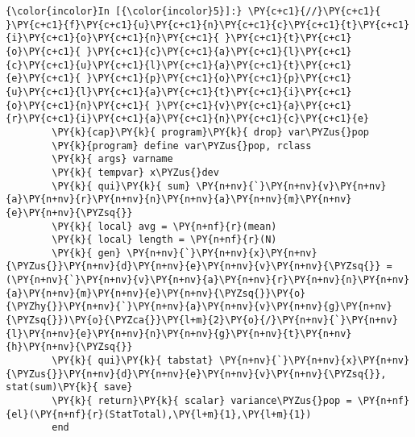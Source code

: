 \documentclass[11pt,notitlepage]{article}\usepackage[]{graphicx}\usepackage[]{color}
\makeatletter
\newenvironment{kframe}{%
 \def\at@end@of@kframe{}%
 \ifinner\ifhmode%
  \def\at@end@of@kframe{\end{minipage}}%
  \begin{minipage}{\columnwidth}%
 \fi\fi%
 \def\FrameCommand##1{\hskip\@totalleftmargin \hskip-\fboxsep
 \colorbox{shadecolor}{##1}\hskip-\fboxsep
     \hskip-\linewidth \hskip-\@totalleftmargin \hskip\columnwidth}%
 \MakeFramed {\advance\hsize-\width
   \@totalleftmargin\z@ \linewidth\hsize
   \@setminipage}}%
 {\par\unskip\endMakeFramed%
 \at@end@of@kframe}
\newenvironment{knitrout}{}{} %
\makeatother
\begin{document}
\begin{enumerate}[a)]
\begin{knitrout}
\begin{kframe}
    \begin{Verbatim}[commandchars=\\\{\}]
{\color{incolor}In [{\color{incolor}5}]:} \PY{c+c1}{//}\PY{c+c1}{ }\PY{c+c1}{f}\PY{c+c1}{u}\PY{c+c1}{n}\PY{c+c1}{c}\PY{c+c1}{t}\PY{c+c1}{i}\PY{c+c1}{o}\PY{c+c1}{n}\PY{c+c1}{ }\PY{c+c1}{t}\PY{c+c1}{o}\PY{c+c1}{ }\PY{c+c1}{c}\PY{c+c1}{a}\PY{c+c1}{l}\PY{c+c1}{c}\PY{c+c1}{u}\PY{c+c1}{l}\PY{c+c1}{a}\PY{c+c1}{t}\PY{c+c1}{e}\PY{c+c1}{ }\PY{c+c1}{p}\PY{c+c1}{o}\PY{c+c1}{p}\PY{c+c1}{u}\PY{c+c1}{l}\PY{c+c1}{a}\PY{c+c1}{t}\PY{c+c1}{i}\PY{c+c1}{o}\PY{c+c1}{n}\PY{c+c1}{ }\PY{c+c1}{v}\PY{c+c1}{a}\PY{c+c1}{r}\PY{c+c1}{i}\PY{c+c1}{a}\PY{c+c1}{n}\PY{c+c1}{c}\PY{c+c1}{e}
        \PY{k}{cap}\PY{k}{ program}\PY{k}{ drop} var\PYZus{}pop
        \PY{k}{program} define var\PYZus{}pop, rclass
        \PY{k}{	args} varname	
        \PY{k}{	tempvar} x\PYZus{}dev 
        \PY{k}{	qui}\PY{k}{ sum} \PY{n+nv}{`}\PY{n+nv}{v}\PY{n+nv}{a}\PY{n+nv}{r}\PY{n+nv}{n}\PY{n+nv}{a}\PY{n+nv}{m}\PY{n+nv}{e}\PY{n+nv}{\PYZsq{}}
        \PY{k}{	local} avg = \PY{n+nf}{r}(mean)
        \PY{k}{	local} length = \PY{n+nf}{r}(N)	
        \PY{k}{	gen} \PY{n+nv}{`}\PY{n+nv}{x}\PY{n+nv}{\PYZus{}}\PY{n+nv}{d}\PY{n+nv}{e}\PY{n+nv}{v}\PY{n+nv}{\PYZsq{}} = (\PY{n+nv}{`}\PY{n+nv}{v}\PY{n+nv}{a}\PY{n+nv}{r}\PY{n+nv}{n}\PY{n+nv}{a}\PY{n+nv}{m}\PY{n+nv}{e}\PY{n+nv}{\PYZsq{}}\PY{o}{\PYZhy{}}\PY{n+nv}{`}\PY{n+nv}{a}\PY{n+nv}{v}\PY{n+nv}{g}\PY{n+nv}{\PYZsq{}})\PY{o}{\PYZca{}}\PY{l+m}{2}\PY{o}{/}\PY{n+nv}{`}\PY{n+nv}{l}\PY{n+nv}{e}\PY{n+nv}{n}\PY{n+nv}{g}\PY{n+nv}{t}\PY{n+nv}{h}\PY{n+nv}{\PYZsq{}}
        \PY{k}{	qui}\PY{k}{ tabstat} \PY{n+nv}{`}\PY{n+nv}{x}\PY{n+nv}{\PYZus{}}\PY{n+nv}{d}\PY{n+nv}{e}\PY{n+nv}{v}\PY{n+nv}{\PYZsq{}}, stat(sum)\PY{k}{ save}
        \PY{k}{	return}\PY{k}{ scalar} variance\PYZus{}pop = \PY{n+nf}{el}(\PY{n+nf}{r}(StatTotal),\PY{l+m}{1},\PY{l+m}{1})
        end
\end{Verbatim}


\end{kframe}
\end{knitrout}
\end{enumerate}
\end{document}
